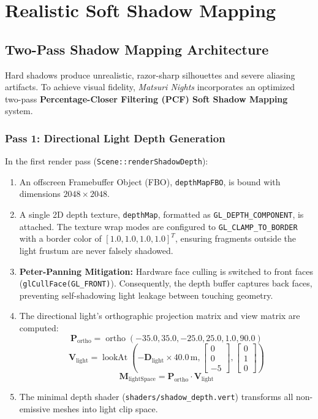 \chapter{Realistic Soft Shadow Mapping}
\label{chap:shadows}

\section{Two-Pass Shadow Mapping Architecture}
Hard shadows produce unrealistic, razor-sharp silhouettes and severe aliasing artifacts. To achieve visual fidelity, \textit{Matsuri Nights} incorporates an optimized two-pass \textbf{Percentage-Closer Filtering (PCF) Soft Shadow Mapping} system.

\subsection{Pass 1: Directional Light Depth Generation}
In the first render pass (\texttt{Scene::renderShadowDepth}):
\begin{enumerate}
    \item An offscreen Framebuffer Object (FBO), \texttt{depthMapFBO}, is bound with dimensions $2048 \times 2048$.
    \item A single 2D depth texture, \texttt{depthMap}, formatted as \texttt{GL\_DEPTH\_COMPONENT}, is attached. The texture wrap modes are configured to \texttt{GL\_CLAMP\_TO\_BORDER} with a border color of $[1.0, 1.0, 1.0, 1.0]^T$, ensuring fragments outside the light frustum are never falsely shadowed.
    \item \textbf{Peter-Panning Mitigation:} Hardware face culling is switched to front faces (\texttt{glCullFace(GL\_FRONT)}). Consequently, the depth buffer captures back faces, preventing self-shadowing light leakage between touching geometry.
    \item The directional light's orthographic projection matrix and view matrix are computed:
    \begin{equation}
    \mathbf{P}_{\text{ortho}} = \operatorname{ortho}(-35.0, 35.0, -25.0, 25.0, 1.0, 90.0)
    \end{equation}
    \begin{equation}
    \mathbf{V}_{\text{light}} = \operatorname{lookAt}\left( -\mathbf{D}_{\text{light}} \times 40.0\,\text{m}, \begin{bmatrix} 0 \\ 0 \\ -5 \end{bmatrix}, \begin{bmatrix} 0 \\ 1 \\ 0 \end{bmatrix} \right)
    \end{equation}
    \begin{equation}
    \mathbf{M}_{\text{lightSpace}} = \mathbf{P}_{\text{ortho}} \cdot \mathbf{V}_{\text{light}}
    \end{equation}
    \item The minimal depth shader (\texttt{shaders/shadow\_depth.vert}) transforms all non-emissive meshes into light clip space.
\end{enumerate}

